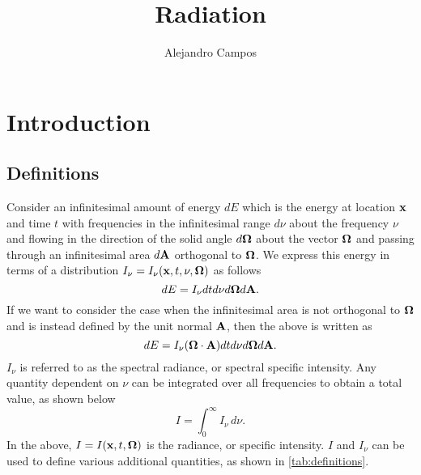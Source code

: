 \documentclass[a4paper,11pt]{report}
\title{Radiation}
\author{Alejandro Campos}
\begin{document}
\maketitle
\tableofcontents

\chapter{Introduction}

\section{Definitions}
Consider an infinitesimal amount of energy $dE$ which is the energy at location $\mathbf{x}$ and time $t$ with frequencies in the infinitesimal range $d\nu$ about the frequency $\nu$ and flowing in the direction of the solid angle $d\bm \Omega$ about the vector $\bm \Omega$ and passing through an infinitesimal area $d\mathbf{A}$ orthogonal to $\bm \Omega$. We express this energy in terms of a distribution $I_\nu = I_\nu(\mathbf{x}, t, \nu, \bm \Omega)$ as follows
\begin{equation}
    dE = I_\nu dt d\nu d\bm \Omega d\mathbf{A}.
\end{equation}
If we want to consider the case when the infinitesimal area is not orthogonal to $\bm \Omega$ and is instead defined by the unit normal $\mathbf{A}$, then the above is written as
\begin{equation}
    dE = I_\nu (\bm \Omega \cdot \mathbf{A}) dt d\nu d\bm \Omega d\mathbf{A}.
\end{equation}
$I_\nu$ is referred to as the spectral radiance, or spectral specific intensity. Any quantity dependent on $\nu$ can be integrated over all frequencies to obtain a total value, as shown below
\begin{equation}
    I = \int_0^\infty I_\nu \, d\nu.
\end{equation}
In the above, $I = I(\mathbf{x}, t, \bm \Omega)$ is the radiance, or specific intensity. $I$ and $I_\nu$ can be used to define various additional quantities, as shown in \cref{tab:definitions}.

\setlength{\cellspacetoplimit}{3pt}
\setlength{\cellspacebottomlimit}{3pt}
\end{document}
